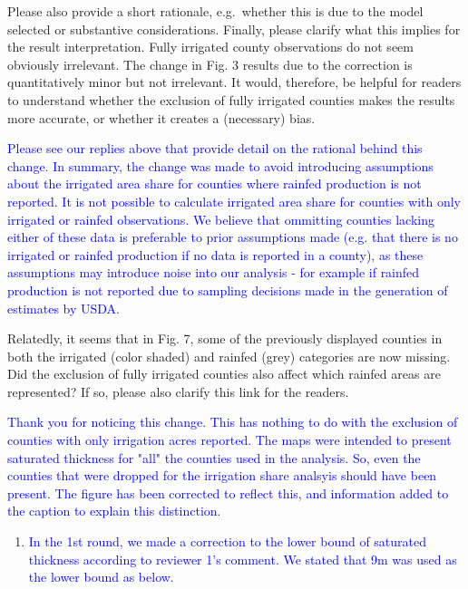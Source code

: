 \documentclass[
]{article}
\providecommand{\tightlist}{%
  \setlength{\itemsep}{0pt}\setlength{\parskip}{0pt}}
\begin{document}
Please also provide a short rationale, e.g.~whether this is due to the
model selected or substantive considerations. Finally, please clarify
what this implies for the result interpretation. Fully irrigated county
observations do not seem obviously irrelevant. The change in Fig. 3
results due to the correction is quantitatively minor but not
irrelevant. It would, therefore, be helpful for readers to understand
whether the exclusion of fully irrigated counties makes the results more
accurate, or whether it creates a (necessary) bias.

\textcolor{blue}{Please see our replies above that provide detail on the rational behind this change. In summary, the change was made to avoid introducing assumptions about the irrigated area share for counties where rainfed production is not reported. It is not possible to calculate irrigated area share for counties with only irrigated or rainfed observations. We believe that ommitting counties lacking either of these data is preferable to prior assumptions made (e.g. that there is no irrigated or rainfed production if no data is reported in a county), as these assumptions may introduce noise into our analysis - for example if rainfed production is not reported due to sampling decisions made in the generation of estimates by USDA.}

Relatedly, it seems that in Fig. 7, some of the previously displayed
counties in both the irrigated (color shaded) and rainfed (grey)
categories are now missing. Did the exclusion of fully irrigated
counties also affect which rainfed areas are represented? If so, please
also clarify this link for the readers.

\textcolor{blue}{Thank you for noticing this change. This has nothing to do with the exclusion of counties with only irrigation acres reported. The maps were intended to present saturated thickness for "all" the counties used in the analysis. So, even the counties that were dropped for the irrigation share analsyis should have been present. The figure has been corrected to reflect this, and information added to the caption to explain this distinction.}

\begin{enumerate}
\def\labelenumi{\arabic{enumi}.}
\tightlist
\item
  \textcolor{blue}{In the 1st round, we made a correction to the lower bound of saturated thickness according to reviewer 1's comment. We stated that 9m was used as the lower bound as below.}
\end{enumerate}
\end{document}
